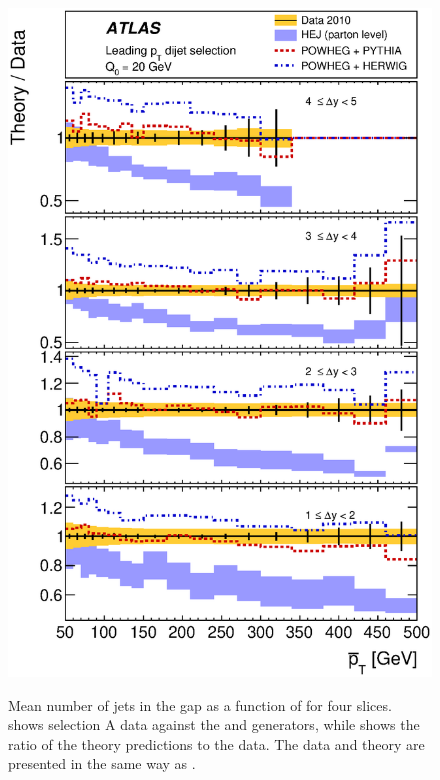 \begin{figure}[htpb]
{    \includegraphics[width=\smallfigwidth]{chapters/gbj/Njet_PtBarDist_gap_Q0_sel_A_Ratio.eps}
    \label{fig:gbj:N_jets_pTbar_A_ratio}}
  \caption{Mean number of jets in the gap as a function of \pTbar for four \DeltaY
           slices. \protect{} shows selection
           A data against the \HEJ and \Powheg generators, while \protect{}
           shows the ratio of the theory predictions to the data. The data and theory
           are presented in the same way as .}
  \label{fig:gbj:N_jets_pTbar_A}
\end{figure}

